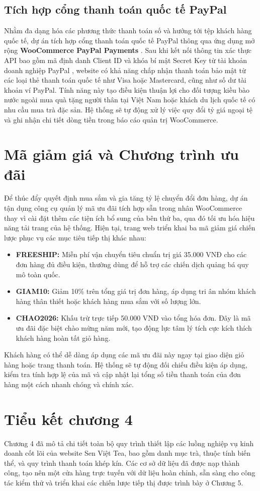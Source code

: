 \subsection{Tích hợp cổng thanh toán quốc tế PayPal}
Nhằm đa dạng hóa các phương thức thanh toán số và hướng tới tệp khách hàng quốc tế, dự án tích hợp cổng thanh toán quốc tế PayPal thông qua ứng dụng mở rộng \textbf{WooCommerce PayPal Payments} \cite{plugin_paypal}. Sau khi kết nối thông tin xác thực API bao gồm mã định danh Client ID và khóa bí mật Secret Key từ tài khoản doanh nghiệp PayPal \cite{paypal_docs}, website có khả năng chấp nhận thanh toán bảo mật từ các loại thẻ thanh toán quốc tế như Visa hoặc Mastercard, cũng như số dư tài khoản ví PayPal. Tính năng này tạo điều kiện thuận lợi cho đối tượng kiều bào nước ngoài mua quà tặng người thân tại Việt Nam hoặc khách du lịch quốc tế có nhu cầu mua trà đặc sản. Hệ thống sẽ tự động xử lý việc quy đổi tỷ giá ngoại tệ và ghi nhận chi tiết dòng tiền trong báo cáo quản trị WooCommerce.

\section{Mã giảm giá và Chương trình ưu đãi}

Để thúc đẩy quyết định mua sắm và gia tăng tỷ lệ chuyển đổi đơn hàng, dự án tận dụng công cụ quản lý mã ưu đãi tích hợp sẵn trong nhân WooCommerce \cite{woocommerce_docs} thay vì cài đặt thêm các tiện ích bổ sung của bên thứ ba, qua đó tối ưu hóa hiệu năng tải trang của hệ thống. Hiện tại, trang web triển khai ba mã giảm giá chiến lược phục vụ các mục tiêu tiếp thị khác nhau:
\begin{itemize}
    \item \textbf{FREESHIP:} Miễn phí vận chuyển tiêu chuẩn trị giá 35.000 VNĐ cho các đơn hàng đủ điều kiện, thường dùng để hỗ trợ các chiến dịch quảng bá quy mô toàn quốc.
    \item \textbf{GIAM10:} Giảm 10\% trên tổng giá trị đơn hàng, áp dụng tri ân nhóm khách hàng thân thiết hoặc khách hàng mua sắm với số lượng lớn.
    \item \textbf{CHAO2026:} Khấu trừ trực tiếp 50.000 VNĐ vào tổng hóa đơn. Đây là mã ưu đãi đặc biệt chào mừng năm mới, tạo động lực tâm lý tích cực kích thích khách hàng hoàn tất giỏ hàng.
\end{itemize}

Khách hàng có thể dễ dàng áp dụng các mã ưu đãi này ngay tại giao diện giỏ hàng hoặc trang thanh toán. Hệ thống sẽ tự động đối chiếu điều kiện áp dụng, kiểm tra tính hợp lệ của mã và cập nhật lại tổng số tiền thanh toán của đơn hàng một cách nhanh chóng và chính xác.

\section*{Tiểu kết chương 4}
Chương 4 đã mô tả chi tiết toàn bộ quy trình thiết lập các luồng nghiệp vụ kinh doanh cốt lõi của website Sen Việt Tea, bao gồm danh mục trà, thuộc tính biến thể, và quy trình thanh toán khép kín. Các cơ sở dữ liệu đã được nạp thành công, tạo nên một cửa hàng trực tuyến với dữ liệu hoàn chỉnh, sẵn sàng cho công tác kiểm thử và triển khai các chiến lược tiếp thị được trình bày ở Chương 5.